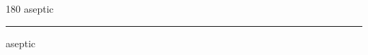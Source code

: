 
\begin{frame}
\begin{center}
\begin{turn}{180}
{\fontsize{2.5cm}{1em}\selectfont aseptic}
\end{turn}
\vspace{1em}\par  
\hrule
\vspace{1em}\par  
{\fontsize{2.5cm}{1em}\selectfont aseptic}
\end{center}
\end{frame}
